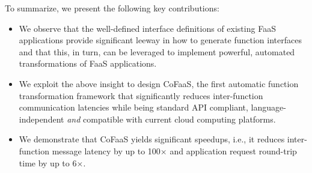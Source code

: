 To summarize, we present the following key contributions:
\begin{itemize}

\item We observe that the well-defined interface definitions of existing FaaS applications provide significant leeway in how to generate function interfaces and that this, in turn, can be leveraged to implement powerful, automated transformations of FaaS applications.

\item We exploit the above insight to design CoFaaS, the first automatic function transformation framework that significantly reduces inter-function communication latencies while being standard API compliant, language-independent {\it and} compatible with current cloud computing platforms.

\item We demonstrate that CoFaaS yields significant speed\-ups, i.e., it reduces inter-function message latency by up to 100$\times$ and application request round-trip time by up to 6$\times$.
\end{itemize}





